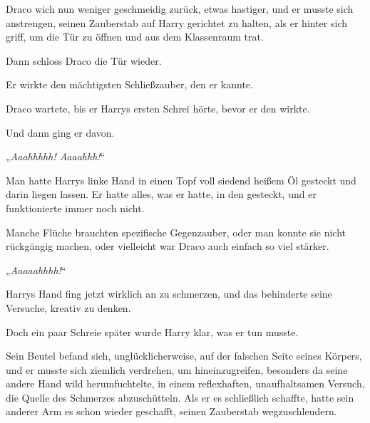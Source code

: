 Draco wich nun weniger geschmeidig zurück, etwas hastiger, und er musste sich anstrengen, seinen Zauberstab auf Harry gerichtet zu halten, als er hinter sich griff, um die Tür zu öffnen und aus dem Klassenraum trat.

Dann schloss Draco die Tür wieder.

Er wirkte den mächtigsten Schließzauber, den er kannte.

Draco wartete, bis er Harrys ersten Schrei hörte, bevor er den  wirkte.

Und dann ging er davon.

\later

„\emph{Aaahhhhh!  Aaaahhh!}“

Man hatte Harrys linke Hand in einen Topf voll siedend heißem Öl gesteckt und darin liegen lassen. Er hatte alles, was er hatte, in den  gesteckt, und er funktionierte immer noch nicht.

Manche Flüche brauchten spezifische Gegenzauber, oder man konnte sie nicht rückgängig machen, oder vielleicht war Draco auch einfach so viel stärker.

„\emph{Aaaaahhhh!}“

Harrys Hand fing jetzt wirklich an zu schmerzen, und das behinderte seine Versuche, kreativ zu denken.

Doch ein paar Schreie später wurde Harry klar, was er tun musste.

Sein Beutel befand sich, unglücklicherweise, auf der falschen Seite seines Körpers, und er musste sich ziemlich verdrehen, um hineinzugreifen, besonders da seine andere Hand wild herumfuchtelte, in einem reflexhaften, unaufhaltsamen Versuch, die Quelle des Schmerzes abzuschütteln. Als er es schließlich schaffte, hatte sein anderer Arm es schon wieder geschafft, seinen Zauberstab wegzuschleudern.

